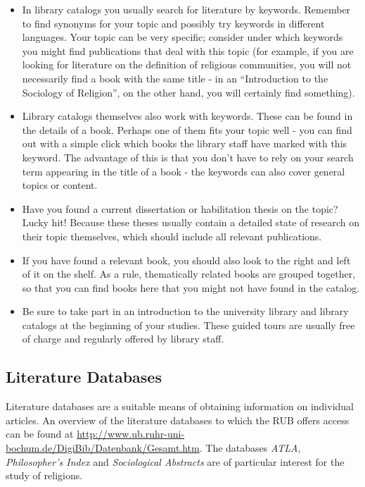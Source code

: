 \documentclass[
  english,
]{scrreprt}
\begin{document}
\begin{itemize}
\item
  In library catalogs you usually search for literature by keywords. Remember to find synonyms for your topic and possibly try keywords in different languages. Your topic can be very specific; consider under which keywords you might find publications that deal with this topic (for example, if you are looking for literature on the definition of religious communities, you will not necessarily find a book with the same title - in an “Introduction to the Sociology of Religion”, on the other hand, you will certainly find something).
\item
  Library catalogs themselves also work with keywords. These can be found in the details of a book. Perhaps one of them fits your topic well - you can find out with a simple click which books the library staff have marked with this keyword. The advantage of this is that you don’t have to rely on your search term appearing in the title of a book - the keywords can also cover general topics or content.
\item
  Have you found a current dissertation or habilitation thesis on the topic? Lucky hit! Because these theses usually contain a detailed state of research on their topic themselves, which should include all relevant publications.
\item
  If you have found a relevant book, you should also look to the right and left of it on the shelf. As a rule, thematically related books are grouped together, so that you can find books here that you might not have found in the catalog.
\item
  Be sure to take part in an introduction to the university library and library catalogs at the beginning of your studies. These guided tours are usually free of charge and regularly offered by library staff.
\end{itemize}

\subsection{Literature Databases}\label{literature-databases}

Literature databases are a suitable means of obtaining information on individual articles. An overview of the literature databases to which the RUB offers access can be found at \url{http://www.ub.ruhr-uni-bochum.de/DigiBib/Datenbank/Gesamt.htm}. The databases \emph{ATLA}, \emph{Philosopher’s Index} and \emph{Sociological Abstracts} are of particular interest for the study of religions.
\end{document}
